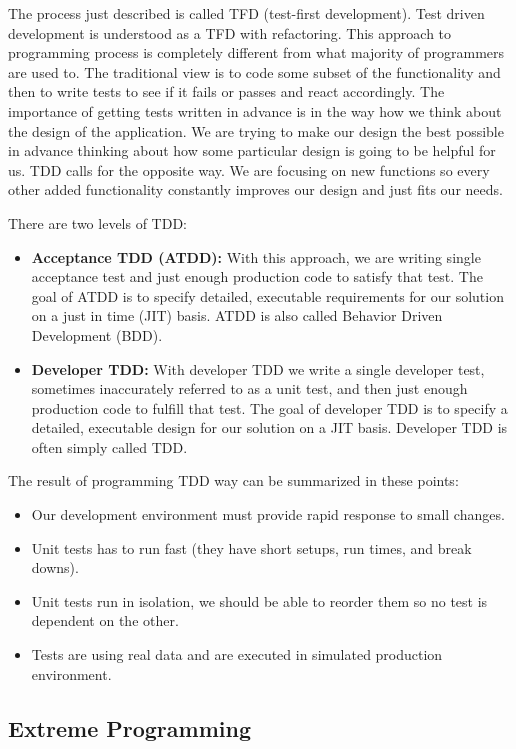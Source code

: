 \documentclass[12pt,final,oneside]{fithesis}
\begin{document}
The process just described is called TFD (test-first development). Test driven development is understood as a TFD with refactoring. This approach to programming process is completely different from what majority of programmers are used to. The traditional view is to code some subset of the functionality and then to write tests to see if it fails or passes and react accordingly. The importance of getting tests written in advance is in the way how we think about the design of the application. We are trying to make our design the best possible in advance thinking about how some particular design is going to be helpful for us. TDD calls for the opposite way. We are focusing on new functions so every other added functionality constantly improves our design and just fits our needs.

There are two levels of TDD:

\begin{itemize}
	\item{\textbf{Acceptance TDD (ATDD):}} With this approach, we are writing single acceptance test and just enough production code to satisfy that test. The goal of ATDD is to specify detailed, executable requirements for our solution on a just in time (JIT) basis. ATDD is also called Behavior Driven Development (BDD).
	\item{\textbf{Developer TDD:}} With developer TDD we write a single developer test, sometimes inaccurately referred to as a unit test, and then just enough production code to fulfill that test. The goal of developer TDD is to specify a detailed, executable design for our solution on a JIT basis.  Developer TDD is often simply called TDD.
\end{itemize}

The result of programming TDD way can be summarized in these points:

\begin{itemize}
	\item{Our development environment must provide rapid response to small changes.}
	\item{Unit tests has to run fast (they have short setups, run times, and break downs).}
	\item{Unit tests run in isolation, we should be able to reorder them so no test is dependent on the other.}
	\item{Tests are using real data and are executed in simulated production environment.}
\end{itemize}	

	\subsection{Extreme Programming}
	
\end{document}
